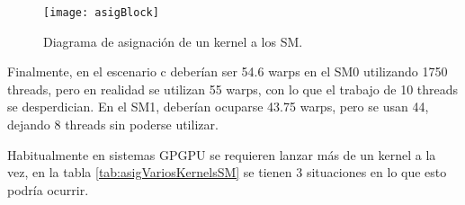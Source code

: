     \begin{figure}[ht]
      \centering
        \texttt{[image: asigBlock]}
        \caption{Diagrama de asignación de un kernel a los SM.}
        \label{fig:asigBlock}
    \end{figure}
    
    Finalmente, en el escenario c deberían ser 54.6 warps en el SM0 utilizando 1750 threads, pero en realidad se utilizan 55 warps, con lo que el trabajo de 10 threads se desperdician. En el SM1, deberían ocuparse 43.75 warps, pero se usan 44, dejando 8 threads sin poderse utilizar.
    \newline
    
Habitualmente en sistemas GPGPU se requieren lanzar más de un kernel a la vez, en la tabla \ref{tab:asigVariosKernelsSM} se tienen 3 situaciones en lo que esto podría ocurrir.
\newline

